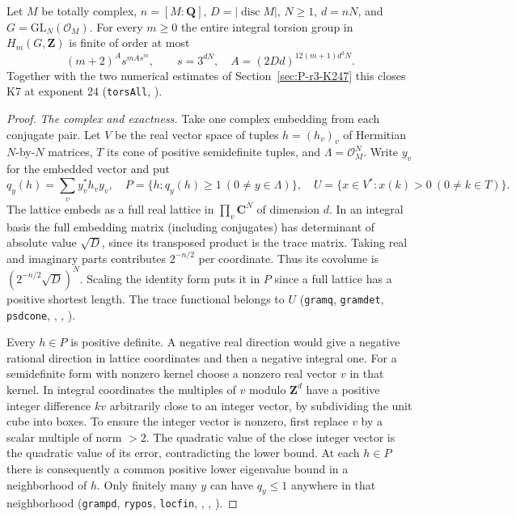 \begin{proposition}
\label{prop:P-r4-k7}
\quad{}
Let $M$ be totally complex, $n=[M:\mathbf Q]$, $D=|\operatorname{disc}M|$,
$N\ge1$, $d=nN$, and $G=\mathrm{GL}_N(\mathcal O_M)$.
For every $m\ge0$ the entire integral torsion group in $H_m(G,\mathbf Z)$
is finite of order at most
\[
 (m+2)^A s^{m A s^m},\qquad
 s=3^{dN},\quad A=(2Dd)^{12(m+1)d^3N}.
\]
Together with the two numerical estimates of Section~\ref{sec:P-r3-K247}
this closes K7 at exponent $24$ (\nolinkurl{torsAll},
).
\end{proposition}
\begin{proof}
\emph{The complex and exactness.}
Take one complex embedding from each conjugate pair. Let $V$ be the
real vector space of tuples $h=(h_v)_v$ of Hermitian $N$-by-$N$
matrices, $T$ its cone of positive semidefinite tuples, and
$\Lambda=\mathcal O_M^N$. Write $y_v$ for the embedded vector and put
\[
 q_y(h)=\sum_v y_v^*h_v y_v,\quad
 P=\{h:q_y(h)\ge1\ (0\ne y\in\Lambda)\},\quad
 U=\{x\in V^*:x(k)>0\ (0\ne k\in T)\}.
\]
The lattice embeds as a full real lattice in $\prod_v\mathbf C^N$
of dimension $d$. In an integral basis the full embedding matrix
(including conjugates) has determinant of absolute value $\sqrt D$,
since its transposed product is the trace matrix. Taking real and
imaginary parts contributes $2^{-n/2}$ per coordinate. Thus its
covolume is $(2^{-n/2}\sqrt D)^N$.
Scaling the identity form puts it in $P$ since a full lattice has a
positive shortest length. The trace functional belongs to $U$
(\nolinkurl{gramq}, \nolinkurl{gramdet}, \nolinkurl{psdcone},
,
,
).

Every $h\in P$ is positive definite. A negative real direction would
give a negative rational direction in lattice coordinates and then a
negative integral one. For a semidefinite form with nonzero kernel
choose a nonzero real vector $v$ in that kernel. In integral
coordinates the multiples of $v$ modulo $\mathbf Z^d$ have a positive
integer difference $kv$ arbitrarily close to an integer vector, by
subdividing the unit cube into boxes. To ensure the integer vector is
nonzero, first replace $v$ by a scalar multiple of norm $>2$.
The quadratic value of the close integer vector is the quadratic value
of its error, contradicting the lower bound. At each $h\in P$ there
is consequently a common positive lower eigenvalue bound in a
neighborhood of $h$. Only finitely many $y$ can have $q_y\le1$ anywhere
in that neighborhood (\nolinkurl{grampd}, \nolinkurl{rypos},
\nolinkurl{locfin}, ,
, ).


\end{proof}

